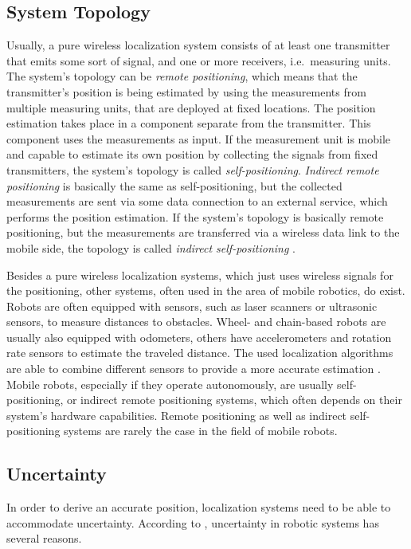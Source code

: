 \subsection{System Topology}
Usually, a pure wireless localization system consists of at least one transmitter that emits some sort of signal, and one or more receivers, i.e.\ measuring units. The system's topology can be \emph{remote positioning}, which means that the transmitter's position is being estimated by using the measurements from multiple measuring units, that are deployed at fixed locations. The position estimation takes place in a component separate from the transmitter. This component uses the measurements as input. If the measurement unit is mobile and capable to estimate its own position by collecting the signals from fixed transmitters, the system's topology is called \emph{self-positioning}. \emph{Indirect remote positioning} is basically the same as self-positioning, but the collected measurements are sent via some data connection to an external service, which performs the position estimation. If the system's topology is basically remote positioning, but the measurements are transferred via a wireless data link to the mobile side, the topology is called \emph{indirect self-positioning} \citep{IEEE:survey_wireless_indoor_pos}.

Besides a pure wireless localization systems, which just uses wireless signals for the positioning, other systems, often used in the area of mobile robotics, do exist. Robots are often equipped with sensors, such as laser scanners or ultrasonic sensors, to measure distances to obstacles. Wheel- and chain-based robots are usually also equipped with odometers, others have accelerometers and rotation rate sensors to estimate the traveled distance. The used localization algorithms are able to combine different sensors to provide a more accurate estimation \citep{thrun:prob_robo}. Mobile robots, especially if they operate autonomously, are usually self-positioning, or indirect remote positioning systems, which often depends on their system's hardware capabilities. Remote positioning as well as indirect self-positioning systems are rarely the case in the field of mobile robots.

\subsection{Uncertainty}
In order to derive an accurate position, localization systems need to be able to accommodate uncertainty. According to \citet{thrun:prob_robo}, uncertainty in robotic systems has several reasons.

